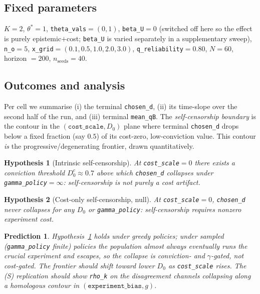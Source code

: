 \documentclass[11pt]{article}
\newcommand{\param}[1]{\texttt{#1}}
\newcommand{\thetastar}{\theta^{\!*}}
\newtheorem{hyp}{Hypothesis}
\newtheorem{prediction}{Prediction}
\begin{document}
\subsection{Fixed parameters}
$K{=}2$, $\thetastar{=}1$, \param{theta\_vals}${=}(0,1)$, \param{beta\_U}${=}0$
(switched off here so the effect is purely epistemic$+$cost; \param{beta\_U} is
varied separately in a supplementary sweep), \param{n\_o}${=}5$,
\param{x\_grid}${=}(0.1,0.5,1.0,2.0,3.0)$, \param{q\_reliability}${=}0.80$,
$N{=}60$, horizon ${=}200$, $n_{\text{seeds}}{=}40$.

\subsection{Outcomes and analysis}
Per cell we summarise (i) the terminal \param{chosen\_d}, (ii) its time-slope over
the second half of the run, and (iii) terminal \param{mean\_qB}. The
\emph{self-censorship boundary} is the contour in the $(\param{cost\_scale},D_0)$
plane where terminal \param{chosen\_d} drops below a fixed fraction (say $0.5$) of
its cost-zero, low-conviction value. This contour \emph{is} the
progressive/degenerating frontier, drawn quantitatively.

\begin{hyp}[Intrinsic self-censorship]\label{h:intrinsic}
At \param{cost\_scale}${=}0$ there exists a conviction threshold
$D_0^{c}\approx 0.7$ above which \param{chosen\_d} collapses under
\param{gamma\_policy}$=\infty$: self-censorship is not purely a cost artifact.
\end{hyp}
\begin{hyp}[Cost-only self-censorship, null]\label{h:costonly}
At \param{cost\_scale}${=}0$, \param{chosen\_d} never collapses for any $D_0$ or
\param{gamma\_policy}: self-censorship requires nonzero experiment cost.
\end{hyp}

\begin{prediction}
Hypothesis~\ref{h:intrinsic} holds under greedy policies; under sampled
(\param{gamma\_policy} finite) policies the population almost always eventually
runs the crucial experiment and escapes, so the collapse is conviction- and
$\gamma$-gated, not cost-gated. The frontier should shift toward lower $D_0$ as
\param{cost\_scale} rises. The (S) replication should show \param{rho\_k} on the
disagreement channels collapsing along a homologous contour in
$(\param{experiment\_bias}, g)$.
\end{prediction}
\end{document}
